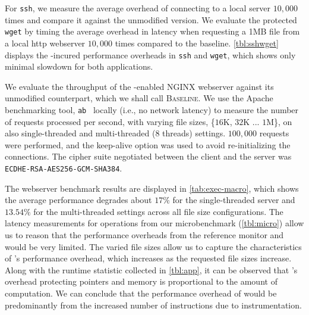 
For \texttt{ssh}, we measure the average overhead of connecting to a local server $10,000$ times and compare it against the unmodified version.
We evaluate the protected \texttt{wget} by timing the average overhead in latency when requesting a 1MB file from a local http webserver $10,000$ times compared to the baseline.
\autoref{tbl:sshwget} displays the \thename-incured performance overheads in \texttt{ssh} and \texttt{wget}, which shows only minimal slowdown for both applications. 



 We evaluate the throughput of the \thename-enabled NGINX webserver against its unmodified counterpart, which we shall call \textsc{Baseline}.
We use the Apache benchmarking tool, \texttt{ab}~\cite{apache-benchmark} locally (i.e., no network latency) to measure the number of requests processed per second, with varying file sizes, \{$16$K, $32$K ... $1$M\}, on also single-threaded and multi-threaded (8 threads) settings.
$100,000$ requests were performed, and the keep-alive option was used to avoid re-initializing the connections.
The cipher suite negotiated between the client and the server was \texttt{ECDHE-RSA-AES256-GCM-SHA384}.


The webserver benchmark results are displayed in \autoref{tab:exec-macro}, which shows the average performance degrades about $17\%$ for the single-threaded server and $13.54\%$ for the multi-threaded settings across all file size configurations.
The latency measurements for \thename operations from our microbenchmark (\autoref{tbl:micro}) allow us to reason that the performance overheads from the reference monitor and \libcapac would be very limited.
The varied file sizes allow us to capture the characteristics of \thename's performance overhead, which increases as the requested file sizes increase.
Along with the runtime statistic collected in \autoref{tbl:app}, it can be observed that \thename's overhead protecting pointers and memory is proportional to the amount of computation.
We can conclude that the performance overhead of \thename would be predominantly from the increased number of instructions due to instrumentation.














